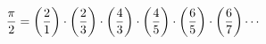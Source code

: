 \documentclass[preview]{standalone}
\begin{document}
\begin{align*}
{\pi \over 2} = \left({2 \over 1}\right) \cdot \left({2 \over 3}\right) \cdot \left({4 \over 3}\right) \cdot \left({4 \over 5}\right) \cdot \left({6 \over 5}\right) \cdot \left({6 \over 7}\right) \cdots
\end{align*}
\end{document}
